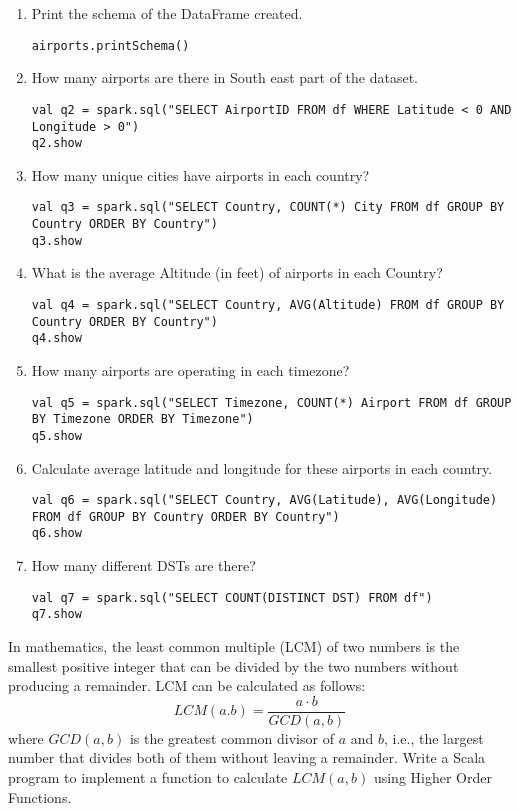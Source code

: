 \documentclass[11pt]{article}
\newcommand{\ques}[1]{\noindent {\bf Question #1: }}
\begin{document}
\begin{enumerate} 
\item Print the schema of the DataFrame created. 
\begin{lstlisting}
airports.printSchema()
\end{lstlisting}

\item How many airports are there in South east part of the dataset. 
\begin{lstlisting}
val q2 = spark.sql("SELECT AirportID FROM df WHERE Latitude < 0 AND Longitude > 0")
q2.show
\end{lstlisting}

\item How many unique cities have airports in each country? 
\begin{lstlisting}
val q3 = spark.sql("SELECT Country, COUNT(*) City FROM df GROUP BY Country ORDER BY Country")
q3.show
\end{lstlisting}

\item What is the average Altitude (in feet) of airports in each Country? 
\begin{lstlisting}
val q4 = spark.sql("SELECT Country, AVG(Altitude) FROM df GROUP BY Country ORDER BY Country")
q4.show
\end{lstlisting}

\item How many airports are operating in each timezone? 
\begin{lstlisting}
val q5 = spark.sql("SELECT Timezone, COUNT(*) Airport FROM df GROUP BY Timezone ORDER BY Timezone")
q5.show
\end{lstlisting}

\item Calculate average latitude and longitude for these airports in each country. 
\begin{lstlisting}
val q6 = spark.sql("SELECT Country, AVG(Latitude), AVG(Longitude) FROM df GROUP BY Country ORDER BY Country")
q6.show
\end{lstlisting}

\item How many different DSTs are there? 
\begin{lstlisting}
val q7 = spark.sql("SELECT COUNT(DISTINCT DST) FROM df")
q7.show
\end{lstlisting}

\end{enumerate} 
\newpage
\ques{6 from HW 2}
In mathematics, the least common multiple (LCM) of two numbers is the smallest positive integer that can be divided by the two numbers without producing a remainder. LCM can be calculated as follows: $$ LCM(a.b) = \frac{a \cdot b}{GCD(a,b)} $$ where $GCD(a,b)$ is the greatest common divisor of $a$ and $b$, i.e., the largest number that divides both of them without leaving a remainder. Write a Scala program to implement a function to calculate $LCM(a,b)$ using Higher Order Functions. 
\end{document}
